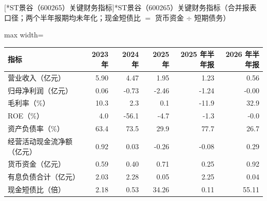 \begin{center}\small\setlength{\tabcolsep}{3.4pt}
[*ST景谷（600265）关键财务指标]{*ST景谷（600265）关键财务指标（合并报表口径；两个半年报期均未年化；现金短债比 $=$ 货币资金 $\div$ 短期债务）}
\begin{adjustbox}{max width=\textwidth}
\begin{tabular}{@{}lrrrrr@{}}
\toprule
指标 & 2023 年 & 2024 年 & 2025 年 & 2025 年半年报 & 2026 年半年报 \\
\midrule
营业收入（亿元） & 5.90 & 4.47 & 1.95 & 1.23 & 0.56 \\
归母净利润（亿元） & 0.06 & -0.73 & -2.46 & -1.24 & -0.00 \\
毛利率（\%） & 10.3 & 2.3 & 0.1 & -11.9 & 32.9 \\
ROE（\%） & 4.0 & -56.1 & -4.7 & -1.3 & -0.0 \\
资产负债率（\%） & 63.4 & 73.5 & 29.9 & 77.7 & 26.7 \\
经营活动现金流净额（亿元） & 0.92 & 0.03 & -0.26 & -0.08 & 0.29 \\
货币资金（亿元） & 0.59 & 0.40 & 0.71 & 0.25 & 0.92 \\
有息负债合计（亿元） & 2.03 & 2.28 & 0.05 & 2.25 & 0.04 \\
现金短债比（倍） & 2.18 & 0.53 & 34.26 & 0.11 & 55.11 \\
\bottomrule
\end{tabular}
\end{adjustbox}
\end{center}

